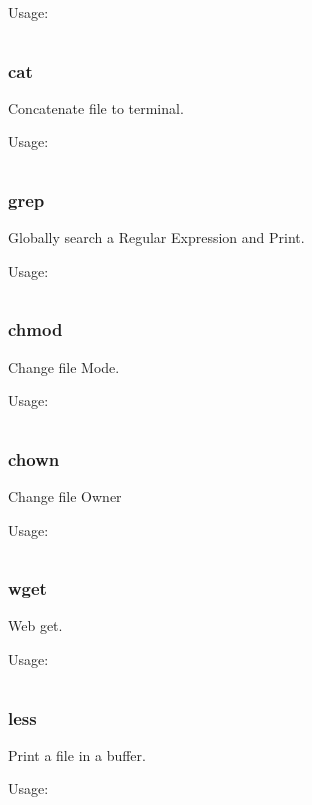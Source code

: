 \documentclass{article}
\begin{document}
	Usage:
	\begin{lstlisting}
	\end{lstlisting}
	
	\subsubsection{cat}
	Concatenate file to terminal.
	
	Usage:
	\begin{lstlisting}
	\end{lstlisting}
	
	\subsubsection{grep}
	Globally search a Regular Expression and Print.
	
	Usage:
	\begin{lstlisting}
	\end{lstlisting}
	
	\subsubsection{chmod}
	Change file Mode.
	
	Usage:
	\begin{lstlisting}
	\end{lstlisting}
	
	\subsubsection{chown}
	Change file Owner
	
	Usage:
	\begin{lstlisting}
	\end{lstlisting}
	
	\subsubsection{wget}
	Web get.
	
	Usage:
	\begin{lstlisting}
	\end{lstlisting}
	
	\subsubsection{less}
	Print a file in a buffer.
	
	Usage:
	\begin{lstlisting}
	\end{lstlisting}
	
\end{document}
